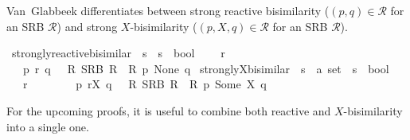 \begin{isabellebody}
{}
\isamarkuptrue%
%
\endisatagdocument
{\isafolddocument}%
%
\isadelimdocument
%
\endisadelimdocument
%
\begin{isamarkuptext}%
Van~Glabbeek differentiates between strong reactive bisimilarity ($(p,q) \in \mathcal{R}$ for an SRB $\mathcal{R}$) and strong $X$-bisimilarity ($(p,X,q) \in \mathcal{R}$ for an SRB $\mathcal{R}$).%
\end{isamarkuptext}\isamarkuptrue%
\isamarkupfalse%
\ strongly{\isacharunderscore}{\kern0pt}reactive{\isacharunderscore}{\kern0pt}bisimilar\ {\isacharcolon}{\kern0pt}{\isacharcolon}{\kern0pt}\ {\isacartoucheopen}{\isacharprime}{\kern0pt}s\ {\isasymRightarrow}\ {\isacharprime}{\kern0pt}s\ {\isasymRightarrow}\ bool{\isacartoucheclose}\ \isanewline
\ \ {\isacharparenleft}{\kern0pt}{\isacartoucheopen}{\isacharunderscore}{\kern0pt}\ {\isasymleftrightarrow}\isactrlsub r\ {\isacharunderscore}{\kern0pt}{\isacartoucheclose}\ {\isacharbrackleft}{\kern0pt}{}{}{\isacharcomma}{\kern0pt}\ {}{}{\isacharbrackright}{\kern0pt}\ {}{}{\isacharparenright}{\kern0pt}\isanewline
\ \ \ {\isacartoucheopen}p\ {\isasymleftrightarrow}\isactrlsub r\ q\ {\isasymequiv}\ {\isasymexists}\ R{\isachardot}{\kern0pt}\ SRB\ R\ {\isasymand}\ R\ p\ None\ q{\isacartoucheclose}\isanewline
\isanewline
{}\isamarkupfalse%
\ strongly{\isacharunderscore}{\kern0pt}X{\isacharunderscore}{\kern0pt}bisimilar\ {\isacharcolon}{\kern0pt}{\isacharcolon}{\kern0pt}\ {\isacartoucheopen}{\isacharprime}{\kern0pt}s\ {\isasymRightarrow}\ {\isacharprime}{\kern0pt}a\ set\ {\isasymRightarrow}\ {\isacharprime}{\kern0pt}s\ {\isasymRightarrow}\ bool{\isacartoucheclose}\ \isanewline
\ \ {\isacharparenleft}{\kern0pt}{\isacartoucheopen}{\isacharunderscore}{\kern0pt}\ {\isasymleftrightarrow}\isactrlsub r\isactrlsup {\isacharunderscore}{\kern0pt}\ {\isacharunderscore}{\kern0pt}{\isacartoucheclose}\ {\isacharbrackleft}{\kern0pt}{}{}{\isacharcomma}{\kern0pt}\ {}{}{\isacharcomma}{\kern0pt}\ {}{}{\isacharbrackright}{\kern0pt}\ {}{}{\isacharparenright}{\kern0pt}\isanewline
\ \ \ {\isacartoucheopen}p\ {\isasymleftrightarrow}\isactrlsub r\isactrlsup X\ q\ {\isasymequiv}\ {\isasymexists}\ R{\isachardot}{\kern0pt}\ SRB\ R\ {\isasymand}\ R\ p\ {\isacharparenleft}{\kern0pt}Some\ X{\isacharparenright}{\kern0pt}\ q{\isacartoucheclose}%
\begin{isamarkuptext}%
For the upcoming proofs, it is useful to combine both reactive and $X$-bisimilarity into a single one.%

\end{isamarkuptext}
\end{isabellebody}
